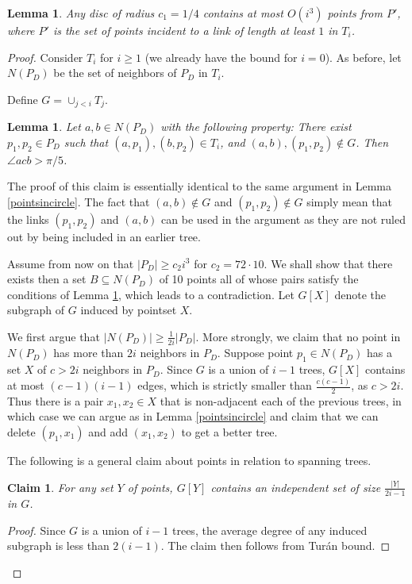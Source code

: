 \documentclass[11pt]{amsart}
\newcounter{foo}
\newtheorem{lemma}[foo]{Lemma}
\newtheorem{claim}[foo]{Claim}
\begin{document}
\begin{lemma}
Any disc of radius $c_1 = 1/4$ contains at most $O(i^3)$ points from $P'$, where $P'$ is the set of points incident
to a link of length at least $1$ in $T_i$. 
\label{pointsincircle-kmst}
\end{lemma}
\begin{proof}
Consider $T_i$ for $i \geq 1$ (we already have the bound for $i = 0$). As before, let $N(P_D)$
be the set of neighbors of $P_D$ in $T_i$.

Define $G = \cup_{j < i} T_j$.

\begin{lemma}
Let $a, b \in N(P_D)$ with the following property:
There exist $p_1, p_2 \in P_D$ such that $(a,p_1), (b,p_2) \in T_i$,
and $(a,b), (p_1,p_2) \not\in G$.
Then $\angle a c b > \pi /5$.
\label{largeangle2}
\end{lemma}
The proof of this claim  is essentially identical to the same argument
in Lemma \ref{pointsincircle}.  The fact that $(a, b) \not \in G$ and
$(p_1, p_2) \not \in G$ simply mean that the links $(p_1, p_2)$ and
$(a, b)$ can be used in the argument as they are not ruled out by
being included in an earlier tree.

Assume from now on that $|P_D| \ge c_2 i^3$ for $c_2 = 72 \cdot 10$.
We shall show that there exists then a set $B \subseteq N(P_D)$ of 10 points all of
whose pairs satisfy the conditions of Lemma \ref{largeangle2}, which
leads to a contradiction. 
Let $G[X]$ denote the subgraph of $G$ induced by pointset $X$.

We first argue that $|N(P_D)| \geq \frac{1}{2i}|P_D|$. More strongly,
we claim that no point in $N(P_D)$ has more than $2 i$ neighbors in
$P_D$. Suppose point $p_1 \in N(P_D)$ has a set $X$ of $c > 2i$
neighbors in $P_D$.  Since $G$ is a union of $i-1$ trees, $G[X]$ contains
at most $(c -1)(i-1)$ edges, which is strictly smaller than
$\frac{c (c-1)}{2}$, as $c > 2 i$. Thus there is a pair $x_1, x_2 \in
X$ that is non-adjacent each of the previous trees, in which case
we can argue as in Lemma \ref{pointsincircle} and claim that we can
delete $(p_1, x_1)$ and add $(x_1, x_2)$ to get a better tree.



The following is a general claim about points in relation to spanning trees.
\begin{claim}
For any set $Y$ of points, $G[Y]$ contains
an independent set of size $\frac{|Y|}{2 i -1}$ in $G$.
\label{largeis}
\end{claim}
\begin{proof}
Since $G$ is a union of $i-1$ trees, the average degree of any induced
subgraph is less than $2(i-1)$. The claim then follows from Tur\'an bound.
\end{proof}


\end{proof}
\end{document}
